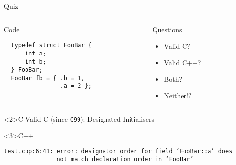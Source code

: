 \documentclass[presentation,aspectratio=169]{beamer}
\begin{document}
\begin{frame}[fragile,label={sec:org23c4234}]{Quiz}
\begin{columns}
\begin{column}{0.48\columnwidth}
\begin{block}{Code}
\begin{verbatim}
  typedef struct FooBar {
      int a;
      int b;
  } FooBar;
  FooBar fb = { .b = 1,
                .a = 2 };
\end{verbatim}
\end{block}
\end{column}

\begin{column}{0.48\columnwidth}
\begin{block}{Questions}
\begin{itemize}
\item Valid C?
\item Valid C++?
\item Both?
\item Neither!?
\end{itemize}
\end{block}
\end{column}
\end{columns}

\begin{block}<2>{C}
Valid C (since \texttt{C99}): Designated Initialisers
\end{block}

\vspace{-1cm}
\begin{block}<3>{C++}
\begin{verbatim}
test.cpp:6:41: error: designator order for field ‘FooBar::a’ does
               not match declaration order in ‘FooBar’
\end{verbatim}
\end{block}
\end{frame}

\end{document}
